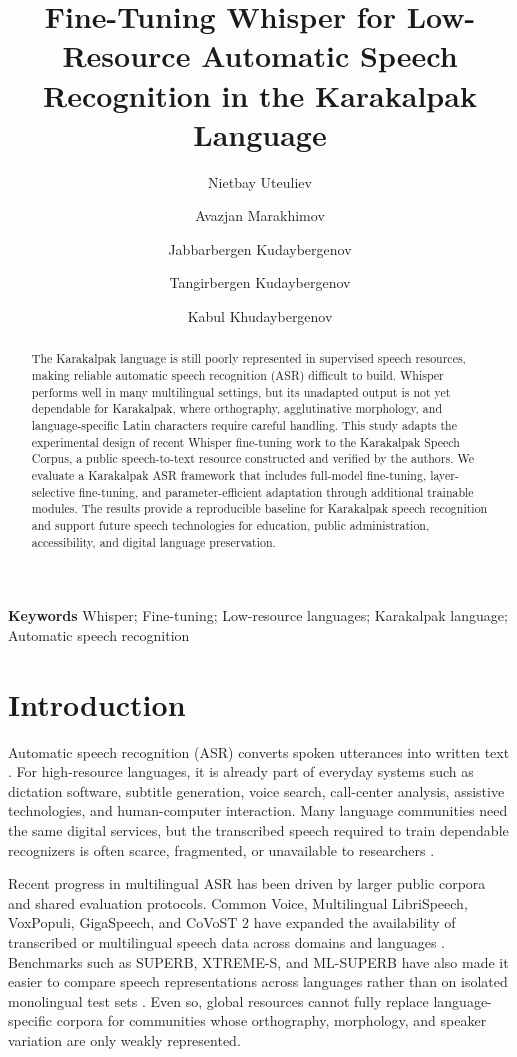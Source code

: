 \documentclass[11pt]{article}
\title{Fine-Tuning Whisper for Low-Resource Automatic Speech Recognition in the Karakalpak Language}
\author{Nietbay Uteuliev \and Avazjan Marakhimov \and Jabbarbergen Kudaybergenov \and Tangirbergen Kudaybergenov \and Kabul Khudaybergenov}
\date{}
\begin{document}
\maketitle

\begin{abstract}
The Karakalpak language is still poorly represented in supervised speech resources, making reliable automatic speech recognition (ASR) difficult to build. Whisper performs well in many multilingual settings, but its unadapted output is not yet dependable for Karakalpak, where orthography, agglutinative morphology, and language-specific Latin characters require careful handling. This study adapts the experimental design of recent Whisper fine-tuning work to the Karakalpak Speech Corpus, a public speech-to-text resource constructed and verified by the authors. We evaluate a Karakalpak ASR framework that includes full-model fine-tuning, layer-selective fine-tuning, and parameter-efficient adaptation through additional trainable modules. The results provide a reproducible baseline for Karakalpak speech recognition and support future speech technologies for education, public administration, accessibility, and digital language preservation.
\end{abstract}

\noindent\textbf{Keywords} Whisper; Fine-tuning; Low-resource languages; Karakalpak language; Automatic speech recognition

\section{Introduction}

Automatic speech recognition (ASR) converts spoken utterances into written text \cite{prabhavalkar2023survey}. For high-resource languages, it is already part of everyday systems such as dictation software, subtitle generation, voice search, call-center analysis, assistive technologies, and human-computer interaction. Many language communities need the same digital services, but the transcribed speech required to train dependable recognizers is often scarce, fragmented, or unavailable to researchers \cite{yadav2022survey,aldarmaki2022unsupervised}.

Recent progress in multilingual ASR has been driven by larger public corpora and shared evaluation protocols. Common Voice, Multilingual LibriSpeech, VoxPopuli, GigaSpeech, and CoVoST 2 have expanded the availability of transcribed or multilingual speech data across domains and languages \cite{ardila2020common,pratap2020mls,wang2021voxpopuli,chen2021gigaspeech,wang2021covost2}. Benchmarks such as SUPERB, XTREME-S, and ML-SUPERB have also made it easier to compare speech representations across languages rather than on isolated monolingual test sets \cite{yang2021superb,conneau2022xtremes,shi2023mlsuperb}. Even so, global resources cannot fully replace language-specific corpora for communities whose orthography, morphology, and speaker variation are only weakly represented.
\end{document}
